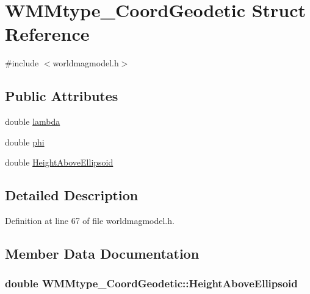 \hypertarget{struct_w_m_mtype___coord_geodetic}{\section{\-W\-M\-Mtype\-\_\-\-Coord\-Geodetic \-Struct \-Reference}
\label{struct_w_m_mtype___coord_geodetic}
}


{\ttfamily \#include $<$worldmagmodel.\-h$>$}

\subsection*{\-Public \-Attributes}
\begin{DoxyCompactItemize}
\item 
double \hyperlink{struct_w_m_mtype___coord_geodetic_ae94dc806d0564cca00a63db68e594225}{lambda}
\item 
double \hyperlink{struct_w_m_mtype___coord_geodetic_afa72809b75b6c5675ffb657d6a85420a}{phi}
\item 
double \hyperlink{struct_w_m_mtype___coord_geodetic_a58419b242080a524d51b52e49ff06e32}{\-Height\-Above\-Ellipsoid}
\end{DoxyCompactItemize}


\subsection{\-Detailed \-Description}


\-Definition at line 67 of file worldmagmodel.\-h.



\subsection{\-Member \-Data \-Documentation}
\hypertarget{struct_w_m_mtype___coord_geodetic_a58419b242080a524d51b52e49ff06e32}{
\subsubsection[{\-Height\-Above\-Ellipsoid}]{\setlength{\rightskip}{0pt plus 5cm}double {\bf \-W\-M\-Mtype\-\_\-\-Coord\-Geodetic\-::\-Height\-Above\-Ellipsoid}}}\label{struct_w_m_mtype___coord_geodetic_a58419b242080a524d51b52e49ff06e32}


